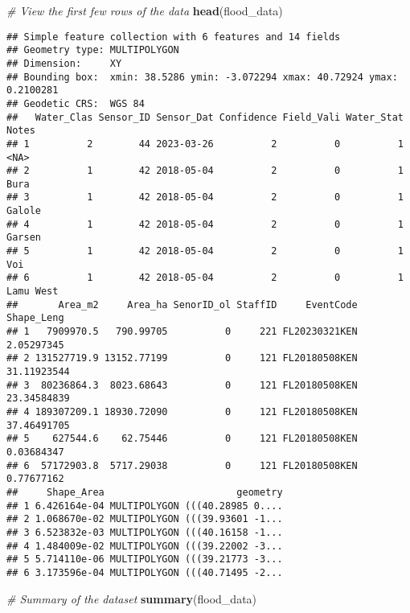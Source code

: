 \documentclass[
]{article}
\newenvironment{Shaded}{\begin{snugshade}}{\end{snugshade}}
\newcommand{\CommentTok}[1]{\textcolor[rgb]{0.56,0.35,0.01}{\textit{#1}}}
\newcommand{\FunctionTok}[1]{\textcolor[rgb]{0.13,0.29,0.53}{\textbf{#1}}}
\newcommand{\NormalTok}[1]{#1}
\begin{document}
\begin{Shaded}
\begin{Highlighting}[]
\CommentTok{\# View the first few rows of the data}
\FunctionTok{head}\NormalTok{(flood\_data)}
\end{Highlighting}
\end{Shaded}

\begin{verbatim}
## Simple feature collection with 6 features and 14 fields
## Geometry type: MULTIPOLYGON
## Dimension:     XY
## Bounding box:  xmin: 38.5286 ymin: -3.072294 xmax: 40.72924 ymax: 0.2100281
## Geodetic CRS:  WGS 84
##   Water_Clas Sensor_ID Sensor_Dat Confidence Field_Vali Water_Stat     Notes
## 1          2        44 2023-03-26          2          0          1      <NA>
## 2          1        42 2018-05-04          2          0          1      Bura
## 3          1        42 2018-05-04          2          0          1    Galole
## 4          1        42 2018-05-04          2          0          1    Garsen
## 5          1        42 2018-05-04          2          0          1       Voi
## 6          1        42 2018-05-04          2          0          1 Lamu West
##       Area_m2     Area_ha SenorID_ol StaffID     EventCode  Shape_Leng
## 1   7909970.5   790.99705          0     221 FL20230321KEN  2.05297345
## 2 131527719.9 13152.77199          0     121 FL20180508KEN 31.11923544
## 3  80236864.3  8023.68643          0     121 FL20180508KEN 23.34584839
## 4 189307209.1 18930.72090          0     121 FL20180508KEN 37.46491705
## 5    627544.6    62.75446          0     121 FL20180508KEN  0.03684347
## 6  57172903.8  5717.29038          0     121 FL20180508KEN  0.77677162
##     Shape_Area                       geometry
## 1 6.426164e-04 MULTIPOLYGON (((40.28985 0....
## 2 1.068670e-02 MULTIPOLYGON (((39.93601 -1...
## 3 6.523832e-03 MULTIPOLYGON (((40.16158 -1...
## 4 1.484009e-02 MULTIPOLYGON (((39.22002 -3...
## 5 5.714110e-06 MULTIPOLYGON (((39.21773 -3...
## 6 3.173596e-04 MULTIPOLYGON (((40.71495 -2...
\end{verbatim}

\begin{Shaded}
\begin{Highlighting}[]
\CommentTok{\# Summary of the dataset}
\FunctionTok{summary}\NormalTok{(flood\_data)}
\end{Highlighting}
\end{Shaded}
\end{document}
